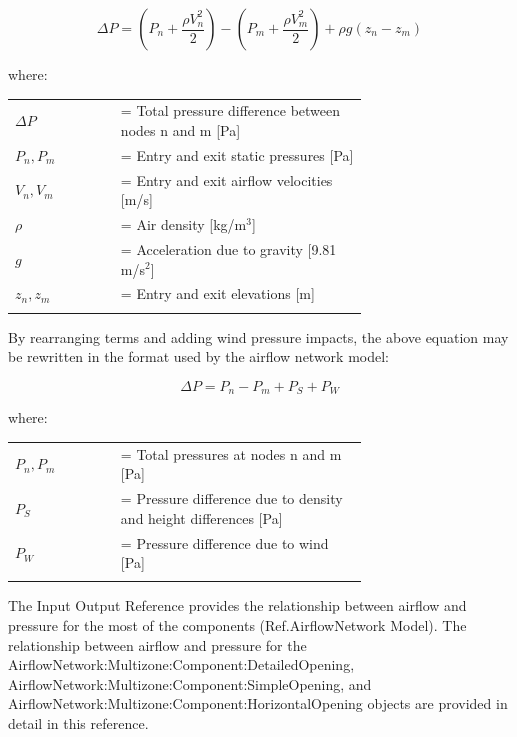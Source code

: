 \begin{equation}
\Delta P = \left( {P_n + \frac{{\rho V_n^2}}{2}} \right) - \left( {P_m + \frac{{\rho V_m^2}}{2}} \right) + \rho g\left( {z_n - z_m} \right)
\end{equation}

where:

\begin{tabular}{lp{0.7\linewidth}}
\\
$\Delta P$ &= Total pressure difference between nodes n and m [Pa] \\
$P_n, P_m$ &= Entry and exit static pressures [Pa] \\
$V_n, V_m$ &= Entry and exit airflow velocities [m/s] \\
$\rho$ &= Air density [kg/m\(^{3}\)] \\
$g$ &= Acceleration due to gravity [9.81 m/s\(^{2}\)] \\
$z_n, z_m$ &= Entry and exit elevations [m] \\
\\
\end{tabular}


By rearranging terms and adding wind pressure impacts, the above equation may be rewritten in the format used by the airflow network model:

\begin{equation}
\Delta P = {P_n} - {P_m} + {P_S} + {P_W}
\end{equation}

where:

\begin{tabular}{lp{0.7\linewidth}}
\\
$P_n, P_m$ &= Total pressures at nodes n and m [Pa] \\
$P_S$ &= Pressure difference due to density and height differences [Pa] \\
$P_W$ &= Pressure difference due to wind [Pa] \\
\\
\end{tabular}

The Input Output Reference provides the relationship between airflow and pressure for the most of the components (Ref.AirflowNetwork Model). The relationship between airflow and pressure for the AirflowNetwork:Multizone:Component:DetailedOpening, AirflowNetwork:Multizone:Component:SimpleOpening, and Air\-flow\-Net\-work:\-Multi\-zone:\-Com\-ponent:\-Horizontal\-Opening objects are provided in detail in this reference.

